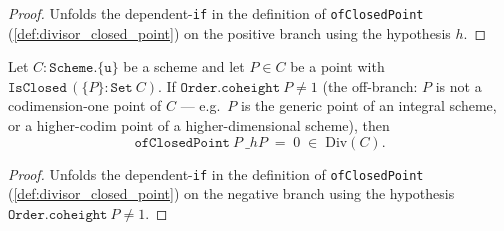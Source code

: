 \begin{proof}
  Unfolds the dependent-\texttt{if} in the definition of
  \texttt{ofClosedPoint} (\ref{def:divisor_closed_point}) on the
  positive branch using the hypothesis \(h\).
\end{proof}
\begin{lemma}
  \label{lem:ofClosedPoint_eq_zero}
  Let \(C : \texttt{Scheme.\{u\}}\) be a scheme and let \(P \in C\) be a
  point with \(\texttt{IsClosed}\,(\{P\} : \texttt{Set}\ C)\). If
  \(\texttt{Order.coheight}\ P \neq 1\) (the off-branch: \(P\) is not a
  codimension-one point of \(C\) --- e.g.\ \(P\) is the generic point of an
  integral scheme, or a higher-codim point of a higher-dimensional
  scheme), then
  \[
    \texttt{ofClosedPoint}\ P\ \_\!hP \;=\;
      0 \;\in\; \mathrm{Div}(C).
  \]
\end{lemma}
\begin{proof}
  Unfolds the dependent-\texttt{if} in the definition of
  \texttt{ofClosedPoint} (\ref{def:divisor_closed_point}) on the
  negative branch using the hypothesis
  \(\texttt{Order.coheight}\ P \neq 1\).
\end{proof}
